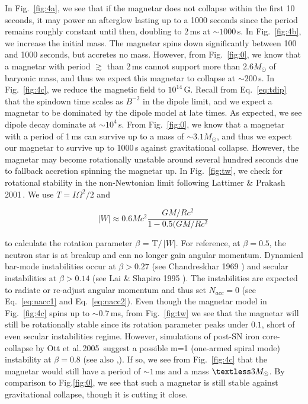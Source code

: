 \documentclass{article}
\begin{document}
In Fig.~\ref{fig:4a}, we see that if the magnetar does not collapse within the first 10 seconds, it may power an afterglow lasting up to a 1000 seconds since the period remains roughly constant until then, doubling to 2\,ms at $\sim 1000$\,s. In Fig.~\ref{fig:4b}, we increase the initial mass. The magnetar spins down significantly between 100 and 1000 seconds, but accretes no mass. However, from Fig.~\ref{fig:0}, we know that a magnetar with period $\gtrsim$ than 2\,ms cannot support more than $2.6 M_{\odot}$ of baryonic mass, and thus we expect this magnetar to collapse at $\sim 200$\,s. In Fig.~\ref{fig:4c}, we reduce the magnetic field to $10^{14}$\,G. Recall from Eq.~\ref{eq:tdip} that the spindown time scales as $B^{-2}$ in the dipole limit, and we expect a magnetar to be dominated by the dipole model at late times. As expected, we see dipole decay dominate at $\sim 10^4$\,s. From Fig.~\ref{fig:0}, we know that a magnetar with a period of 1\,ms can survive up to a mass of $\sim 3.1 M_{\odot}$, and thus we expect our magnetar to survive up to 1000\,s against gravitational collapse. However, the magnetar may become rotationally unstable around several hundred seconds due to fallback accretion spinning the magnetar up. In Fig.~\ref{fig:tw}, we check for rotational stability in the non-Newtonian limit following Lattimer \& Prakash 2001\,\cite{Lattimer:2001ap}. We use $T= I\Omega^2/2$ and 

\begin{equation}
  |W| \approx 0.6 M c^2 \frac{GM/Rc^2}{1-0.5(GM/Rc^2}\,
\end{equation}

to calculate the rotation parameter $\beta$ = T$/$\,$|W|$. For reference, at $\beta=0.5$, the neutron star is at breakup and can no longer gain angular momentum. Dynamical bar-mode instabilities occur at $\beta > 0.27$ (see Chandreskhar 1969 \cite{chand}) and secular instabilities at $\beta > 0.14$ (see Lai \& Shapiro 1995 \cite{Lai:1994ke}). The instabilities are expected to radiate or re-adjust angular momentum and thus set $N_{acc} = 0$ (see Eq.~\ref{eq:nacc1} and Eq.~\ref{eq:nacc2}). Even though the magnetar model in Fig.~\ref{fig:4c} spins up to $\sim 0.7$\,ms, from Fig.~\ref{fig:tw} we see that the magnetar will still be rotationally stable since its rotation parameter peaks under $0.1$, short of even secular instabilities regime. However, simulations of post-SN iron core-collapse by Ott et al.\,2005\,\cite{Ott:2005gj} suggest a possible m=1 (one-armed spiral mode) instability at $\beta = 0.8$ (see also\,\cite{Ott:2006eh}\,,\cite{Ott:2006eu}). If so, we see from Fig.~\ref{fig:4c} that the magnetar would still have a period of $\sim 1$\,ms and a mass $\textless 3 M_{\odot}$. By comparison to Fig.\ref{fig:0}, we see that such a magnetar is still stable against gravitational collapse, though it is cutting it close.
\end{document}
